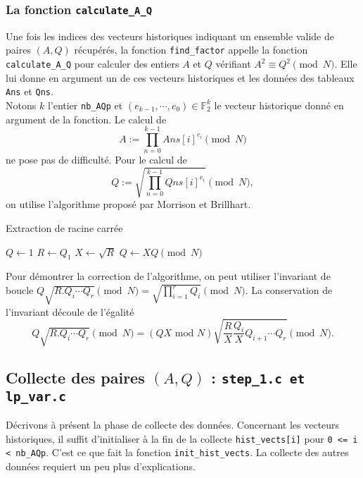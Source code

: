 \newpage 
\subsubsection{La fonction \texttt{calculate\_A\_Q}}

Une fois les indices des vecteurs historiques indiquant un ensemble valide de paires 
$(A, Q)$ récupérés, la fonction \texttt{find\_factor} appelle la fonction
\texttt{calculate\_A\_Q} pour calculer des entiers $A$ et $Q$ vérifiant
$A^2 \equiv Q^2 \pmod{N}$. Elle lui donne en argument un de ces vecteurs
historiques et les données des tableaux \texttt{Ans} et \texttt{Qns}. \\

Notons $k$ l'entier \texttt{nb\_AQp} et $(e_{k-1}, \cdots , e_0) \in 
\mathbb{F}_2^{k}$ le vecteur historique donné en argument de la fonction. Le
calcul de \[A:= \prod_{n=0}^{k-1} Ans[i]^{e_i} \pmod{N} \] ne pose pas de 
difficulté. Pour le calcul de \[Q:= \sqrt{\prod_{n=0}^{k-1 } Qns[i] ^{e_i}}
\pmod{N},\] on utilise l'algorithme proposé par Morrison et Brillhart.

\vspace{1em}
\begin{algorithm}[H]
\DontPrintSemicolon
\caption{\sc Extraction de racine carrée}
$Q \gets 1$\;
$R \gets Q_1$\;
$X \gets \sqrt{R}$\;
    $Q \gets XQ \pmod{N}$\;
\;
\end{algorithm}
\vspace{1em}

Pour démontrer la correction de l'algorithme, on peut utiliser l'invariant de 
boucle $Q\sqrt{R.Q_i\cdots Q_r} \pmod{N} = \sqrt{\prod_{i=1}^r Q_{i}}
\pmod{N}$. La conservation de l'invariant découle de l'égalité
\[  Q\sqrt{R.Q_i\cdots Q_r} \pmod{N} = 
(QX\text{ mod }N) \sqrt{ \frac{R}{X}\frac{Q_i}{X}Q_{i+1} \cdots Q_r} \pmod{N}.\]

\subsection{Collecte des paires $(A,Q)$ : \texttt{step\_1.c et lp\_var.c}}

Décrivons à présent la phase de collecte des données. Concernant les vecteurs
historiques, il suffit d'initialiser à la fin de la 
collecte \texttt{hist\_vects[i]} pour \texttt{0 <= i < nb\_AQp}. C'est ce que fait 
la fonction \texttt{init\_hist\_vects}. La collecte des autres données 
requiert un peu plus d'explications. 

